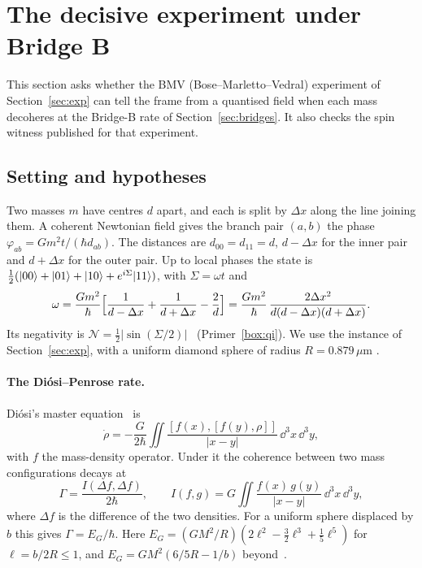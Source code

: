 \section{The decisive experiment under Bridge B}\label{sec:bmv}

This section asks whether the BMV (Bose--Marletto--Vedral) experiment of Section~\ref{sec:exp} can tell the frame from a quantised field
when each mass decoheres at the Bridge-B rate of Section~\ref{sec:bridges}. It also checks the spin witness published for that experiment.

\subsection{Setting and hypotheses}\label{ss:bmv-setting}

Two masses $m$ have centres $d$ apart, and each is split by $\Delta x$ along the line joining them. A coherent Newtonian field gives the
branch pair $(a,b)$ the phase $\varphi_{ab}=Gm^2t/(\hbar d_{ab})$. The distances are $d_{00}=d_{11}=d$, $d-\Delta x$ for the inner pair and
$d+\Delta x$ for the outer pair. Up to local phases the state is $\tfrac12(\lvert 00\rangle+\lvert 01\rangle+\lvert 10\rangle+e^{i\Sigma}\lvert 11\rangle)$, with
$\Sigma=\omega t$ and
\begin{equation}\label{eq:bmv-omega}
\omega=\frac{Gm^2}{\hbar}\Bigl[\frac1{d-\Delta x}+\frac1{d+\Delta x}-\frac2d\Bigr]=\frac{Gm^2}{\hbar}\,\frac{2\Delta x^2}{d(d-\Delta x)(d+\Delta x)} .
\end{equation}
Its negativity is $\mathcal N=\tfrac12|\sin(\Sigma/2)|$~\cite{vw} (Primer~\ref{box:qi}). We use the instance of Section~\ref{sec:exp}, with
a uniform diamond sphere of radius $R=0.879\,\mu$m .

\paragraph{The Di\'osi--Penrose rate.} Di\'osi's master equation~\cite{diosi87} is
\begin{equation*}
\dot\rho=-\frac{G}{2\hbar}\iint\frac{[f(x),[f(y),\rho]]}{|x-y|}\,\dd^3x\,\dd^3y ,
\end{equation*}
with $f$ the mass-density operator. Under it the coherence between two mass configurations decays at
\begin{equation}\label{eq:bmv-dp}
\Gamma=\frac{I(\Delta f,\Delta f)}{2\hbar},\qquad I(f,g)=G\iint\frac{f(x)\,g(y)}{|x-y|}\,\dd^3x\,\dd^3y ,
\end{equation}
where $\Delta f$ is the difference of the two densities. For a uniform sphere displaced by $b$ this gives $\Gamma=E_G/\hbar$. Here
$E_G=(GM^2/R)(2\ell^2-\tfrac32\ell^3+\tfrac15\ell^5)$ for $\ell=b/2R\le1$, and $E_G=GM^2(6/5R-1/b)$ beyond~\cite{penrose96,howl2019}.

